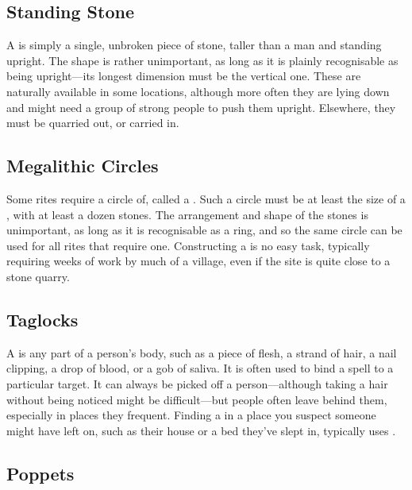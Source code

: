 \subsection{Standing Stone}

A  is simply a single, unbroken piece of stone, taller than a man and standing upright.
The shape is rather unimportant, as long as it is plainly recognisable as being upright---its longest dimension must be the vertical one.
These are naturally available in some locations, although more often they are lying down and might need a group of strong people to push them upright.
Elsewhere, they must be quarried out, or carried in.

\subsection{Megalithic Circles}

Some rites require a circle of, called a .
Such a circle must be at least the size of a , with at least a dozen stones.
The arrangement and shape of the stones is unimportant, as long as it is recognisable as a ring, and so the same circle can be used for all rites that require one.
Constructing a  is no easy task, typically requiring weeks of work by much of a village, even if the site is quite close to a stone quarry.

\subsection{Taglocks}

A  is any part of a person's body, such as a piece of flesh, a strand of hair, a nail clipping, a drop of blood, or a gob of saliva.
It is often used to bind a spell to a particular target.
It can always be picked off a person---although taking a hair without being noticed might be difficult---but people often leave  behind them, especially in places they frequent.
Finding a  in a place you suspect someone might have left on, such as their house or a bed they've slept in, typically uses .

\subsection{Poppets}

